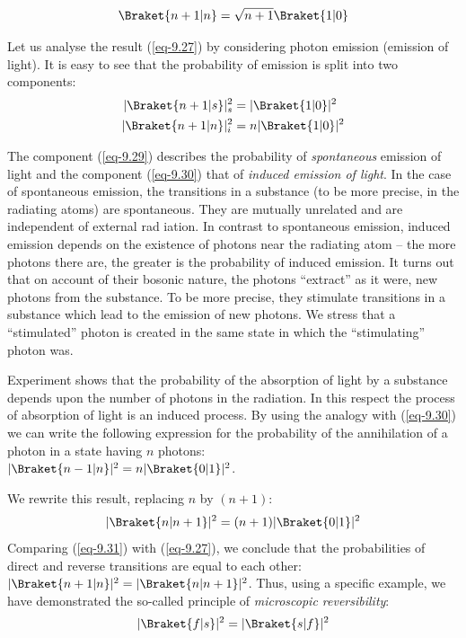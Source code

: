 \documentclass[a4paper,sfsidenotes,colorlinks=true]{tufte-book}
\numberwithin{equation}{section}
\numberwithin{figure}{section}
\begin{document}
\begin{equation}%
\Braket{n + 1 | n}  = \sqrt{n + 1}  \Braket{1 | 0}
\label{eq-9.28}
\end{equation}

Let us analyse the result (\ref{eq-9.27}) by considering photon
emission (emission of light). It is easy to see that the probability
of emission is split into two components:
\begin{align}%
|\Braket{n + 1 | s} |^{2}_{s} & =   |\Braket{1 | 0}|^{2}
\label{eq-9.29} \\
|\Braket{n + 1 | n} |^{2}_{i} & =   n|\Braket{1 | 0}|^{2}
\label{eq-9.30} 
\end{align}

The component (\ref{eq-9.29}) describes the probability of
\emph{spontaneous} emission of light and the component (\ref{eq-9.30})
that of \emph{induced emission of light}. In the case of spontaneous
emission, the transitions in a substance (to be more precise, in the
radiating atoms) are spontaneous. They are mutually unrelated and are
independent of external rad iation. In contrast to spontaneous
emission, induced emission depends on the existence of photons near
the radiating atom -- the more photons there are, the greater is the
probability of induced emission. It turns out that on account of their
bosonic nature, the photons ``extract'' as it were, new photons from
the substance. To be more precise, they stimulate transitions in a
substance which lead to the emission of new photons. We stress that a
``stimulated'' photon is created in the same state in which the
``stimulating'' photon was. 


Experiment  shows that the
probability of the absorption of light by a substance depends upon the
number of photons in the radiation. In this respect the process of
absorption of light is an induced process. By using the analogy with
(\ref{eq-9.30}) we can write the following expression for the
probability of the annihilation of a photon in a state having $n$
photons:\\
 $|\Braket{n-1|n}|^{2} = n |\Braket{0|1}|^{2}$.

We rewrite this result, replacing $n$ by $(n + 1)$:
\begin{equation}%
|\Braket{n|n+1}|^{2} = (n+1) |\Braket{0|1}|^{2}
 \label{eq-9.31}
\end{equation}
Comparing (\ref{eq-9.31}) with (\ref{eq-9.27}), we conclude that the
probabilities of direct and reverse transitions are equal to each
other:\\ 
 $|\Braket{n+1|n}|^{2} =  |\Braket{n|n+1}|^{2}$.
Thus, using a specific example, we have demonstrated the
so-called principle of \emph{microscopic reversibility}:
\begin{equation}%
|\Braket{f|s}|^{2} = |\Braket{s|f}|^{2}
 \label{eq-9.32}
\end{equation}
\end{document}
